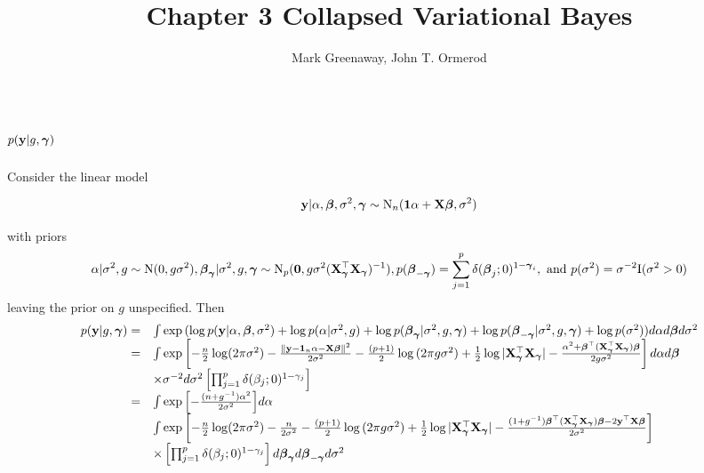 \documentclass{amsart}[12pt]
\title{Chapter 3 Collapsed Variational Bayes}
\author{Mark Greenaway, John T. Ormerod}
\theoremstyle{definition}
\begin{document}
\section{$p({\bf y} | g, {\boldsymbol \gamma})$}
\noindent Consider the linear model

\[
	{\bf y} | \alpha, {\boldsymbol \beta}, \sigma^2, {\boldsymbol \gamma} \sim \text{N}_n({\bf 1} \alpha + {\bf X} {\boldsymbol \beta}, \sigma^2)
\]

\noindent with priors
\[
	\alpha | \sigma^2, g \sim \text{N}(0, g \sigma^2),
	{\boldsymbol \beta}_{\boldsymbol \gamma} | \sigma^2, g, {\boldsymbol \gamma} \sim \text{N}_p({\bf 0}, g \sigma^2 ({\bf X}_{\boldsymbol \gamma}^\top {\bf X}_{\boldsymbol \gamma})^{-1}),
	p({\boldsymbol \beta}_{-{\boldsymbol \gamma}}) = \sum_{j=1}^p \delta({\boldsymbol \beta}_j; 0)^{1 - {\boldsymbol \gamma}_i}, \text{ and }
	p(\sigma^2) = \sigma^{-2} \text{I}(\sigma^2 > 0)
\]
leaving the prior on $g$ unspecified. Then
$$
\begin{array}{rl}
	p({\bf y} | g, {\boldsymbol \gamma}) =&
	\int \exp{(\log p({\bf y}| \alpha, {\boldsymbol\beta}, \sigma^2)
	+ \log p(\alpha | \sigma^2, g)
	+ \log p({\boldsymbol\beta}_{\boldsymbol\gamma}| \sigma^2, g, {\boldsymbol\gamma})
	+ \log p({\boldsymbol\beta}_{-{\boldsymbol\gamma}} | \sigma^2, g, {\boldsymbol\gamma})
	+ \log p(\sigma^2))} d \alpha d {\boldsymbol \beta} d \sigma^2 \\
	=& \int \exp{\left[
	-\frac{n}{2} \log (2 \pi \sigma^2)
	- \frac{\|{\bf y}- {\bf1}_n \alpha - {\bf X}{\boldsymbol\beta}\|^2}{2 \sigma^2} 
	-\frac{(p + 1)}{2} \log{(2\pi g \sigma^2)}
	+ \frac{1}{2} \log{|{\bf X}_{\boldsymbol\gamma}^\top {\bf X}_{\boldsymbol\gamma}|}
	- \frac{\alpha^2 + {\boldsymbol\beta}^\top ({\bf X}_{\boldsymbol\gamma}^\top {\bf X}_{\boldsymbol\gamma}) {\boldsymbol\beta}}{2 g \sigma^{2}} \right] d \alpha d {\boldsymbol\beta}} \\
	&\times \sigma^{-2} d \sigma^2
	\left[ \prod_{j=1}^p \delta(\beta_j; 0)^{1 - \gamma_j} \right] \\
	=& \int \exp{\left[
	-\frac{(n + g^{-1})\alpha^2}{2 \sigma^2} \right]} d \alpha \\
	&  \int \exp{\left[
	-\frac{n}{2} \log (2 \pi \sigma^2)
	-\frac{n}{2 \sigma^2} 
	-\frac{(p + 1)}{2} \log{(2\pi g \sigma^2)}
	+ \frac{1}{2} \log{|{\bf X}_{\boldsymbol\gamma}^\top {\bf X}_{\boldsymbol\gamma}|}
	- \frac{(1 + g^{-1}){\boldsymbol\beta}^\top ({\bf X}_{\boldsymbol\gamma}^\top {\bf X}_{\boldsymbol\gamma}) {\boldsymbol\beta}- 2 {\bf y}^\top {\bf X}{\boldsymbol\beta}}{2 \sigma^{2}}
	\right]}  \\
	&\times \left[ \prod_{j=1}^p \delta(\beta_j; 0)^{1 - \gamma_j} \right] d {\boldsymbol \beta}_{\boldsymbol \gamma} d {\boldsymbol \beta}_{-{\boldsymbol \gamma}} d \sigma^2
\end{array}
$$
\end{document}
